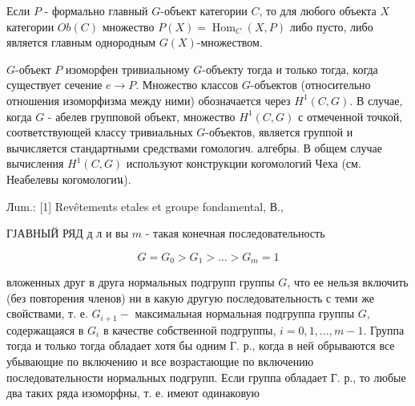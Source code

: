 \documentclass[10pt]{article}
\begin{document}
Если $P$ - формально главный $G$-объект категории $C$, то для любого объекта $X$ категории $O b(C)$ множество $P(X)=\operatorname{Hom}_{C}(X, P)$ либо пусто, либо является главным однородным $G(X)$-множеством.



$G$-объект $P$ изоморфен тривиальному $G$-объекту тогда и только тогда, когда существует сечение $e \rightarrow P$. Множество классов $G$-объектов (относительно отношения изоморфизма между ними) обозначается через $H^{1}(C, G)$. В случае, когда $G$ - абелев групповой объект, множество $H^{1}(C, G)$ с отмеченной точкой, соответствующей классу тривиальных $G$-объектов, является группой и вычисляется стандартными средствами гомологич. алгебры. В общем случае вычисления $H^{1}(C, G)$ используют конструкции когомологий Чеха (см. Неабелевы когомологиน).



Лum.: [1] Revêtements etales et groupe fondamental, В.,



ГЈАВНЫЙ РЯД д л и вы $m$ - такая конечная последовательность



\[

G=G_{0}>G_{1}>\ldots>G_{m}=1

\]



вложенных друг в друга нормальных подгрупп группы $G$, что ее нельзя включить (без повторения членов) ни в какую другую последовательность с теми же свойствами, т. е. $G_{i+1}-$ максимальная нормальная подгруппа группы $G$, содержащаяся в $G_{i}$ в качестве собственной подгруппы, $i=0,1, \ldots, m-1$. Группа тогда и только тогда обладает хотя бы одним Г. р., когда в ней обрываются все убывающие по включению и все возрастающие по включению последовательности нормальных подгрупп. Если группа обладает Г. р., то любые два таких ряда изоморфны, т. е. имеют одинаковую
\end{document}
